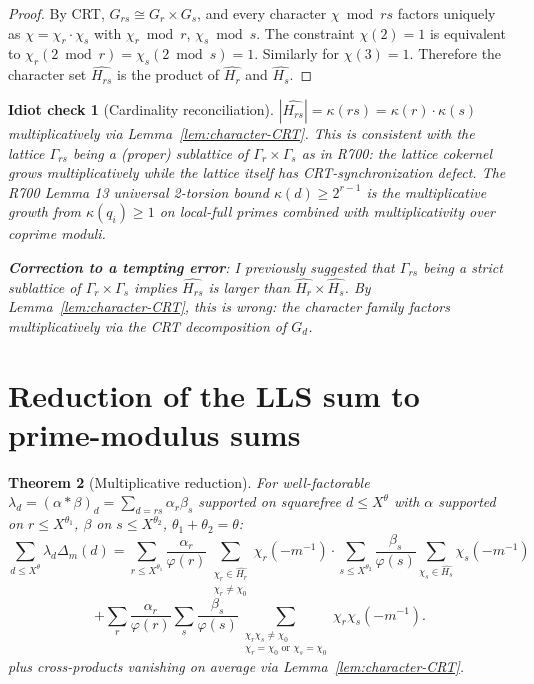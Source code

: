 \documentclass[11pt]{article}
\newtheorem{theorem}{Theorem}[section]
\newtheorem{warning}[theorem]{Idiot check}
\begin{document}
\begin{proof}
By CRT, $G_{rs} \cong G_r \times G_s$, and every character $\chi \bmod rs$ factors uniquely as $\chi = \chi_r \cdot \chi_s$ with $\chi_r \bmod r$, $\chi_s \bmod s$. The constraint $\chi(2) = 1$ is equivalent to $\chi_r(2 \bmod r) = \chi_s(2 \bmod s) = 1$. Similarly for $\chi(3) = 1$. Therefore the character set $\widehat{H_{rs}}$ is the product of $\widehat{H_r}$ and $\widehat{H_s}$.
\end{proof}

\begin{warning}[Cardinality reconciliation]
$|\widehat{H_{rs}}| = \kappa(rs) = \kappa(r) \cdot \kappa(s)$ \emph{multiplicatively} via Lemma~\ref{lem:character-CRT}. This is consistent with the lattice $\Gamma_{rs}$ being a (proper) sublattice of $\Gamma_r \times \Gamma_s$ as in R700: the lattice cokernel grows multiplicatively while the lattice itself has CRT-synchronization defect. The R700 Lemma 13 universal 2-torsion bound $\kappa(d) \geq 2^{r-1}$ is the multiplicative growth from $\kappa(q_i) \geq 1$ on local-full primes combined with multiplicativity over coprime moduli.

\textbf{Correction to a tempting error}: I previously suggested that $\Gamma_{rs}$ being a strict sublattice of $\Gamma_r \times \Gamma_s$ implies $\widehat{H_{rs}}$ is larger than $\widehat{H_r} \times \widehat{H_s}$. By Lemma~\ref{lem:character-CRT}, this is wrong: the character family factors multiplicatively via the CRT decomposition of $G_d$.
\end{warning}

\section{Reduction of the LLS sum to prime-modulus sums}

\begin{theorem}[Multiplicative reduction]\label{thm:multiplicative-reduction}
For well-factorable $\lambda_d = (\alpha * \beta)_d = \sum_{d = rs} \alpha_r \beta_s$ supported on squarefree $d \leq X^\theta$ with $\alpha$ supported on $r \leq X^{\theta_1}$, $\beta$ on $s \leq X^{\theta_2}$, $\theta_1 + \theta_2 = \theta$:
\[
\sum_{d \leq X^\theta} \lambda_d \Delta_m(d)
= \sum_{r \leq X^{\theta_1}} \frac{\alpha_r}{\varphi(r)}
\sum_{\substack{\chi_r \in \widehat{H_r} \\ \chi_r \neq \chi_0}} \chi_r(-m^{-1})
\cdot \sum_{s \leq X^{\theta_2}} \frac{\beta_s}{\varphi(s)}
\sum_{\chi_s \in \widehat{H_s}} \chi_s(-m^{-1})
\]
\[
+ \sum_{r} \frac{\alpha_r}{\varphi(r)} \sum_{s} \frac{\beta_s}{\varphi(s)}
\sum_{\substack{\chi_r \chi_s \neq \chi_0 \\ \chi_r = \chi_0 \text{ or } \chi_s = \chi_0}} \chi_r \chi_s(-m^{-1}).
\]
plus cross-products vanishing on average via Lemma~\ref{lem:character-CRT}.
\end{theorem}
\end{document}
